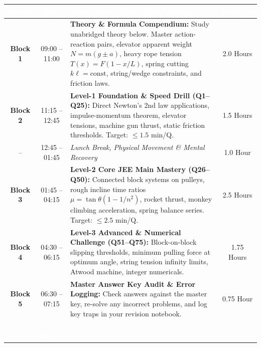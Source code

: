 \documentclass[11pt,a4paper]{article}
\begin{document}
\begin{center}
\renewcommand{\arraystretch}{1.25}
\small
\begin{tabularx}{\textwidth}{|c|c|X|c|}
\hline
\rowcolor{tableDarkHeader}
\textcolor{white}{\textbf{Session}} & \textcolor{white}{\textbf{Time}} & \textcolor{white}{\textbf{Focus Area \& High-Yield Strategy}} & \textcolor{white}{\textbf{Duration}} \\
\hline
\rowcolor{white}
\textbf{Block 1} & 09:00 -- 11:00 & \textbf{Theory \& Formula Compendium:} Study unabridged theory below. Master action-reaction pairs, elevator apparent weight $N=m(g\pm a)$, heavy rope tension $T(x)=F(1-x/L)$, spring cutting $k\ell=\text{const}$, string/wedge constraints, and friction laws. & 2.0 Hours \\
\hline
\rowcolor{tableStripe}
\textbf{Block 2} & 11:15 -- 12:45 & \textbf{Level-1 Foundation \& Speed Drill (Q1--Q25):} Direct Newton's 2nd law applications, impulse-momentum theorem, elevator tensions, machine gun thrust, static friction thresholds. Target: $\le 1.5$ min/Q. & 1.5 Hours \\
\hline
\rowcolor{white}
-- & 12:45 -- 01:45 & \textit{Lunch Break, Physical Movement \& Mental Recovery} & 1.0 Hour \\
\hline
\rowcolor{tableStripe}
\textbf{Block 3} & 01:45 -- 04:15 & \textbf{Level-2 Core JEE Main Mastery (Q26--Q50):} Connected block systems on pulleys, rough incline time ratios $\mu=\tan\theta(1-1/n^2)$, rocket thrust, monkey climbing acceleration, spring balance series. Target: $\le 2.5$ min/Q. & 2.5 Hours \\
\hline
\rowcolor{white}
\textbf{Block 4} & 04:30 -- 06:15 & \textbf{Level-3 Advanced \& Numerical Challenge (Q51--Q75):} Block-on-block slipping thresholds, minimum pulling force at optimum angle, string tension infinity limits, Atwood machine, integer numericals. & 1.75 Hours \\
\hline
\rowcolor{tableStripe}
\textbf{Block 5} & 06:30 -- 07:15 & \textbf{Master Answer Key Audit \& Error Logging:} Check answers against the master key, re-solve any incorrect problems, and log key traps in your revision notebook. & 0.75 Hour \\
\hline
\rowcolor{tableDarkHeader}
\multicolumn{3}{|r|}{\textcolor{white}{\textbf{TOTAL DEDICATED STUDY TIME}}} & \textcolor{white}{\textbf{8.0 Hours}} \\
\hline
\end{tabularx}
\end{center}
\end{document}
